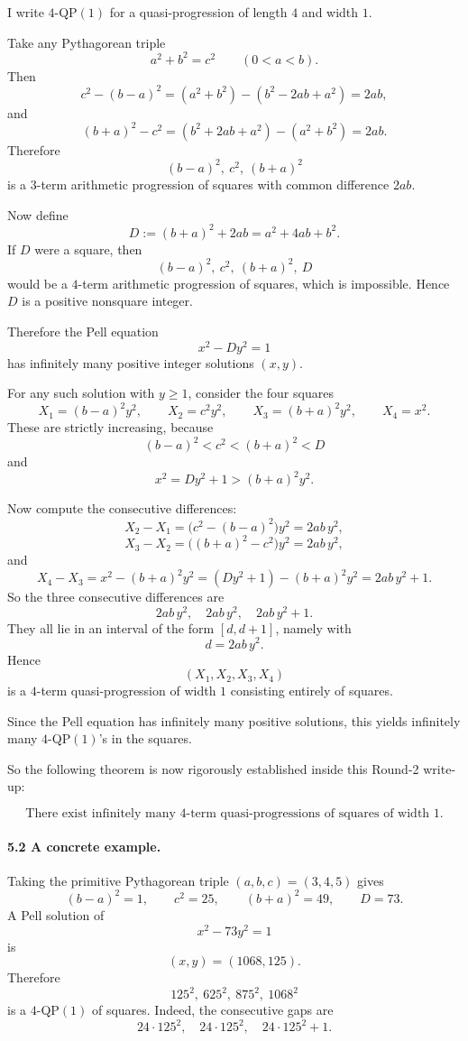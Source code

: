 I write $4$-QP$(1)$ for a quasi-progression of length $4$ and width $1$.

\medskip

Take any Pythagorean triple
\[
a^2+b^2=c^2
\qquad (0<a<b).
\]
Then
\[
c^2-(b-a)^2=(a^2+b^2)-(b^2-2ab+a^2)=2ab,
\]
and
\[
(b+a)^2-c^2=(b^2+2ab+a^2)-(a^2+b^2)=2ab.
\]
Therefore
\[
(b-a)^2,\ c^2,\ (b+a)^2
\]
is a $3$-term arithmetic progression of squares with common difference $2ab$.

Now define
\[
D:=(b+a)^2+2ab=a^2+4ab+b^2.
\]
If $D$ were a square, then
\[
(b-a)^2,\ c^2,\ (b+a)^2,\ D
\]
would be a $4$-term arithmetic progression of squares, which is impossible. Hence $D$ is a positive nonsquare integer.

Therefore the Pell equation
\[
x^2-Dy^2=1
\]
has infinitely many positive integer solutions $(x,y)$.

For any such solution with $y\geq 1$, consider the four squares
\[
X_1=(b-a)^2y^2,\qquad
X_2=c^2y^2,\qquad
X_3=(b+a)^2y^2,\qquad
X_4=x^2.
\]
These are strictly increasing, because
\[
(b-a)^2<c^2<(b+a)^2<D
\]
and
\[
x^2=Dy^2+1>(b+a)^2y^2.
\]

Now compute the consecutive differences:
\[
X_2-X_1=\bigl(c^2-(b-a)^2\bigr)y^2=2ab\,y^2,
\]
\[
X_3-X_2=\bigl((b+a)^2-c^2\bigr)y^2=2ab\,y^2,
\]
and
\[
X_4-X_3=x^2-(b+a)^2y^2=(Dy^2+1)-(b+a)^2y^2=2ab\,y^2+1.
\]
So the three consecutive differences are
\[
2ab\,y^2,\quad 2ab\,y^2,\quad 2ab\,y^2+1.
\]
They all lie in an interval of the form $[d,d+1]$, namely with
\[
d=2ab\,y^2.
\]
Hence
\[
(X_1,X_2,X_3,X_4)
\]
is a $4$-term quasi-progression of width $1$ consisting entirely of squares.

Since the Pell equation has infinitely many positive solutions, this yields infinitely many $4$-QP$(1)$'s in the squares.

\medskip

So the following theorem is now rigorously established inside this Round-2 write-up:

\[
\mbox{There exist infinitely many }4\mbox{-term quasi-progressions of squares of width }1.
\]

\paragraph{5.2 A concrete example.}

Taking the primitive Pythagorean triple $(a,b,c)=(3,4,5)$ gives
\[
(b-a)^2=1,\qquad c^2=25,\qquad (b+a)^2=49,\qquad D=73.
\]
A Pell solution of
\[
x^2-73y^2=1
\]
is
\[
(x,y)=(1068,125).
\]
Therefore
\[
125^2,\ 625^2,\ 875^2,\ 1068^2
\]
is a $4$-QP$(1)$ of squares. Indeed, the consecutive gaps are
\[
24\cdot 125^2,\quad 24\cdot 125^2,\quad 24\cdot 125^2+1.
\]

